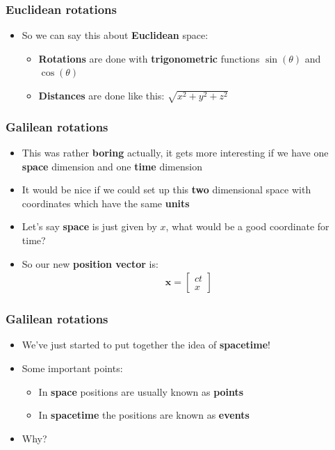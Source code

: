 \documentclass{beamer}
\begin{document}
\begin{frame}
  \frametitle{Euclidean rotations}
  \begin{itemize}
    \item<1-> So we can say this about \textbf{Euclidean} space:
      \begin{itemize}
	\item<2-> \textbf{Rotations} are done with \textbf{trigonometric} functions $\sin(\theta)$ and $\cos(\theta)$
	\item<3-> \textbf{Distances} are done like this: $\sqrt{x^2+y^2+z^2}$
      \end{itemize}
  \end{itemize}
\end{frame}

\begin{frame}
  \frametitle{Galilean rotations}
  \begin{itemize}
    \item<1-> This was rather \textbf{boring} actually, it gets more interesting if we have one \textbf{space} dimension and one \textbf{time} dimension
    \item<2-> It would be nice if we could set up this \textbf{two} dimensional space with coordinates which have the same \textbf{units}
    \item<3-> Let's say \textbf{space} is just given by $x$, what would be a good coordinate for time?
    \item<4-> So our new \textbf{position vector} is:
      \begin{align*}
	\mathbf{x}=
	\begin{bmatrix}
	  ct\\
	  x
	\end{bmatrix}
      \end{align*}
  \end{itemize}
\end{frame}

\begin{frame}
  \frametitle{Galilean rotations}
  \begin{itemize}
    \item<1-> We've just started to put together the idea of \textbf{spacetime}!
    \item<2-> Some important points:
      \begin{itemize}
	\item In \textbf{space} positions are usually known as \textbf{points}
	\item In \textbf{spacetime} the positions are known as \textbf{events}
      \end{itemize}
    \item<3-> Why?
  \end{itemize}
\end{frame}
\end{document}
